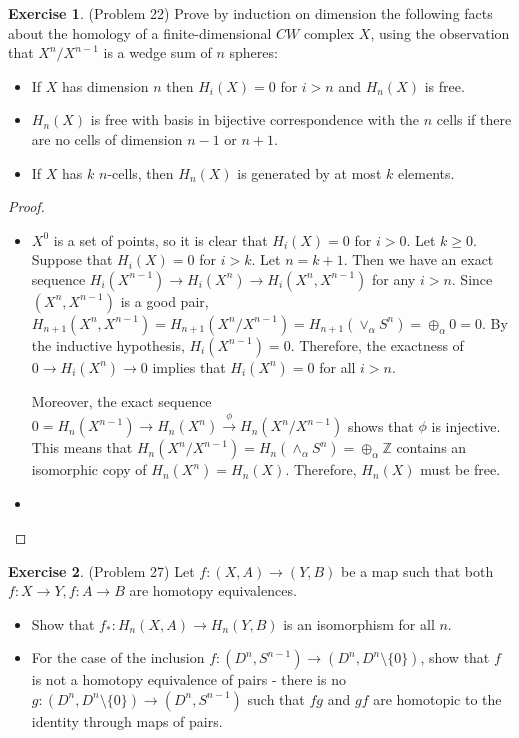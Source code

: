 \documentclass[12pt, psamsfonts]{amsart}
\theoremstyle{definition}
\newtheorem*{exer}{Exercise}
\theoremstyle{remark}
\numberwithin{equation}{section}
\begin{document}
\begin{exer}{(Problem 22)}
  Prove by induction on dimension the following facts about the homology of a finite-dimensional $CW$ complex $X$, using the observation that $X^n / X^{n-1}$ is a wedge sum of $n$ spheres:
  \begin{itemize}
    \item
      If $X$ has dimension $n$ then $H_i(X) = 0$ for $i > n$ and $H_n(X)$ is free.
    \item
      $H_n(X)$ is free with basis in bijective correspondence with the $n$ cells if there are no cells of dimension $n - 1$ or $n + 1$.
    \item
      If $X$ has $k$ $n$-cells, then $H_n(X)$ is generated by at most $k$ elements.
  \end{itemize}
\end{exer}

\begin{proof}
$ $
  \begin{itemize}
    \item
      $X^0$ is a set of points, so it is clear that $H_i(X) = 0$ for $i > 0$.
      Let $k \geq 0$.
      Suppose that $H_i(X) = 0$ for $i > k$.
      Let $n = k + 1$.
      Then we have an exact sequence $H_{i}(X^{n - 1}) \rightarrow H_{i}(X^n) \rightarrow H_{i}(X^n, X^{n - 1})$ for any $i > n$.
      Since $(X^n, X^{n - 1})$ is a good pair, $H_{n + 1}(X^n, X^{n - 1}) = H_{n + 1}(X^n / X^{n - 1}) = H_{n + 1}(\vee_{\alpha} S^n) = \oplus_{\alpha} 0 = 0$.
      By the inductive hypothesis, $H_i(X^{n - 1}) = 0$.
      Therefore, the exactness of $0 \rightarrow H_i(X^n) \rightarrow 0$ implies that $H_i(X^n) = 0$ for all $i > n$.

      Moreover, the exact sequence $0 = H_n(X^{n - 1}) \rightarrow H_n(X^n) \xrightarrow{\phi} H_n(X^n / X^{n - 1})$ shows that $\phi$ is injective.
      This means that $H_n(X^n / X^{n - 1}) = H_n(\wedge_{\alpha} S^n) = \oplus_{\alpha} \mathbb{Z}$ contains an isomorphic copy of $H_n(X^n) = H_n(X)$.
      Therefore, $H_n(X)$ must be free.
    \item
  \end{itemize}
\end{proof}

\begin{exer}{(Problem 27)}
  Let $f:(X, A) \rightarrow (Y, B)$ be a map such that both $f: X \rightarrow Y, f:A \rightarrow B$ are homotopy equivalences.

  \begin{itemize}
    \item
      Show that $f_* : H_n(X, A) \rightarrow  H_n(Y, B)$ is an isomorphism for all $n$.
    \item
      For the case of the inclusion $f:(D^n, S^{n - 1}) \rightarrow (D^n, D^n \setminus \{ 0 \})$, show that $f$ is not a homotopy equivalence of pairs -
      there is no $g: (D^n, D^n \setminus \{ 0 \}) \rightarrow (D^n, S^{n - 1})$ such that $fg$ and $gf$ are homotopic to the identity through maps of pairs.
  \end{itemize}
\end{exer}
\end{document}

